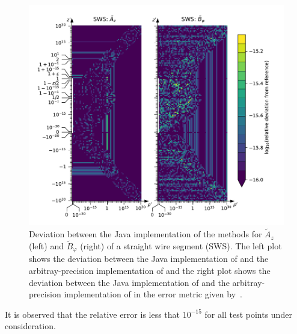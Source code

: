 \begin{figure}[htbp]
 \centering
 \includegraphics[width=\textwidth]{img/StraightWireSegment_results.pdf}
 \caption{Deviation between the Java implementation of the methods for $\tilde{A}_z$ (left)
          and $\tilde{B}_\varphi$ (right) of a straight wire segment (SWS).
          The left  plot shows the deviation between the Java implementation of 
                         and the arbitray-precision implementation of 
          and
          the right plot shows the deviation between the Java implementation of 
                         and the arbitray-precision implementation of 
          in the error metric given by~.}
 \label{fig:StraightWireSegment_results}
\end{figure}
It is observed that the relative error is less that $10^{-15}$ for all test points under consideration.

